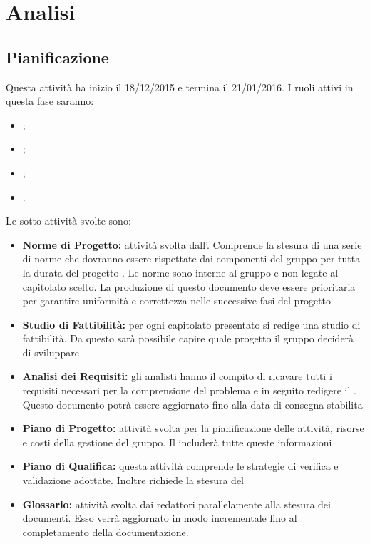 \documentclass[12pt,a4paper]{article}
\begin{document}
\section{Analisi}
\subsection{Pianificazione} %
Questa attività ha inizio il 18/12/2015 e termina il 21/01/2016. I ruoli attivi in questa fase saranno:
\begin{itemize}
	\item \PM;
	\item \AM;
	\item \AN;
	\item \VR.
\end{itemize}
Le sotto attività svolte sono:
\begin{itemize}
	\item \textbf{Norme di Progetto:} attività svolta dall’\AM. Comprende la stesura di una serie di norme che dovranno essere rispettate dai componenti del gruppo per tutta la durata del progetto \prjL. Le norme sono interne al gruppo e non legate al capitolato scelto. La produzione di questo documento deve essere prioritaria per garantire uniformità e correttezza nelle successive fasi del progetto
	\item \textbf{Studio di Fattibilità:} per ogni capitolato presentato si redige una studio di fattibilità. Da questo sarà possibile capire quale progetto il gruppo deciderà di sviluppare
	\item \textbf{Analisi dei Requisiti:} gli analisti hanno il compito di ricavare tutti i requisiti necessari per la comprensione del problema e in seguito redigere il \AdR. Questo documento potrà essere aggiornato fino alla data di consegna stabilita
	\item \textbf{Piano di Progetto:} attività svolta per la pianificazione delle attività, risorse e costi della gestione del gruppo. Il \PdP{} includerà tutte queste informazioni
	\item \textbf{Piano di Qualifica:} questa attività comprende le strategie di verifica e validazione adottate. Inoltre richiede la stesura del \PdQ
	\item \textbf{Glossario:} attività svolta dai redattori parallelamente alla stesura dei documenti. Esso verrà aggiornato in modo incrementale fino al completamento della documentazione.
\end{itemize}
\end{document}
